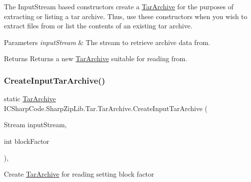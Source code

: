 The Input\+Stream based constructors create a \hyperlink{class_i_c_sharp_code_1_1_sharp_zip_lib_1_1_tar_1_1_tar_archive}{Tar\+Archive} for the purposes of extracting or listing a tar archive. Thus, use these constructors when you wish to extract files from or list the contents of an existing tar archive. 


\begin{DoxyParams}{Parameters}
{\em input\+Stream} & The stream to retrieve archive data from.\\
\hline
\end{DoxyParams}
\begin{DoxyReturn}{Returns}
Returns a new \hyperlink{class_i_c_sharp_code_1_1_sharp_zip_lib_1_1_tar_1_1_tar_archive}{Tar\+Archive} suitable for reading from.
\end{DoxyReturn}
\mbox{\label{class_i_c_sharp_code_1_1_sharp_zip_lib_1_1_tar_1_1_tar_archive_afc90896556a6bde9e0117935a8749ec1}} 
\subsubsection{\texorpdfstring{Create\+Input\+Tar\+Archive()}{CreateInputTarArchive()}\hspace{0.1cm}{\footnotesize\ttfamily [2/2]}}
{\footnotesize\ttfamily static \hyperlink{class_i_c_sharp_code_1_1_sharp_zip_lib_1_1_tar_1_1_tar_archive}{Tar\+Archive} I\+C\+Sharp\+Code.\+Sharp\+Zip\+Lib.\+Tar.\+Tar\+Archive.\+Create\+Input\+Tar\+Archive (\begin{DoxyParamCaption}\item[{Stream}]{input\+Stream,  }\item[{int}]{block\+Factor }\end{DoxyParamCaption})\hspace{0.3cm}{\ttfamily [inline]}, {\ttfamily [static]}}



Create \hyperlink{class_i_c_sharp_code_1_1_sharp_zip_lib_1_1_tar_1_1_tar_archive}{Tar\+Archive} for reading setting block factor 


